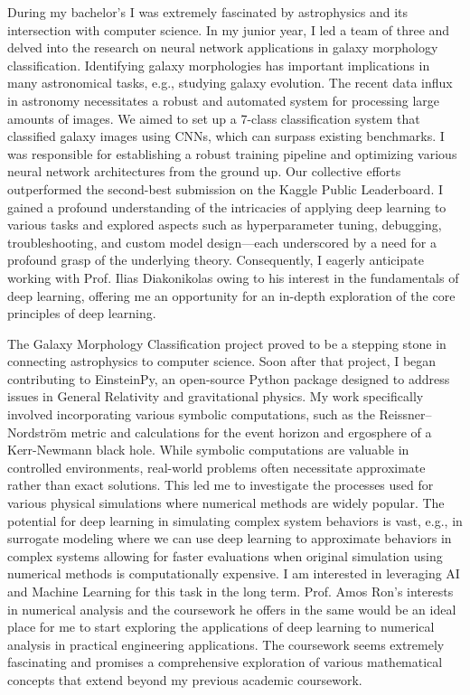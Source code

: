 \documentclass{article}
\begin{document}
\hspace{0.25in}During my bachelor’s I was extremely fascinated by astrophysics
and its intersection with computer science. In my junior year, I led a team of
three and delved into the research on neural network applications in galaxy
morphology classification. Identifying galaxy morphologies has important
implications in many astronomical tasks, e.g., studying galaxy evolution. The
recent data influx in astronomy necessitates a robust and automated system for
processing large amounts of images. We aimed to set up a 7-class classification
system that classified galaxy images using CNNs, which can surpass existing
benchmarks. I was responsible for establishing a robust training pipeline and
optimizing various neural network architectures from the ground up. Our
collective efforts outperformed the second-best submission on the Kaggle Public
Leaderboard. I gained a profound understanding of the intricacies of applying
deep learning to various tasks and explored aspects such as hyperparameter
tuning, debugging, troubleshooting, and custom model design—each underscored by
a need for a profound grasp of the underlying theory. Consequently, I eagerly
anticipate working with Prof. Ilias Diakonikolas owing to his interest in the
fundamentals of deep learning, offering me an opportunity for an in-depth
exploration of the core principles of deep learning.  
\vspace{2pt}

\hspace{0.25in}The Galaxy Morphology Classification project proved to be a
stepping stone in connecting astrophysics to computer science. Soon after that
project, I began contributing to EinsteinPy, an open-source Python package
designed to address issues in General Relativity and gravitational physics. My
work specifically involved incorporating various symbolic computations, such as
the Reissner–Nordström metric and calculations for the event horizon and
ergosphere of a Kerr-Newmann black hole. While symbolic computations are
valuable in controlled environments, real-world problems often necessitate
approximate rather than exact solutions. This led me to investigate the
processes used for various physical simulations where numerical methods are
widely popular. The potential for deep learning in simulating complex system
behaviors is vast, e.g., in surrogate modeling where we can use deep learning to
approximate behaviors in complex systems allowing for faster evaluations when
original simulation using numerical methods is computationally expensive. I am
interested in leveraging AI and Machine Learning for this task in the long term.
Prof. Amos Ron’s interests in numerical analysis and the coursework he offers in
the same would be an ideal place for me to start exploring the applications of
deep learning to numerical analysis in practical engineering applications. The
coursework seems extremely fascinating and promises a comprehensive exploration
of various mathematical concepts that extend beyond my previous academic
coursework. 
\vspace{2pt}
\end{document}
